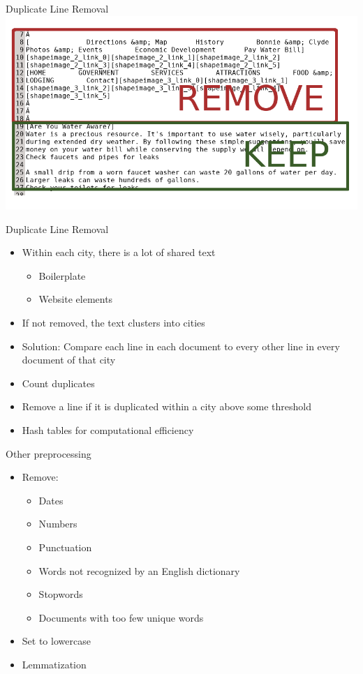 \documentclass[12pt]{beamer}
\begin{document}
\begin{frame}{Duplicate Line Removal}
	\includegraphics[width = \linewidth]{duplicateLineRemoval.png}
\end{frame}

\begin{frame}{Duplicate Line Removal}
\begin{itemize}
	\item Within each city, there is a lot of shared text
	\begin{itemize}
		\item Boilerplate
		\item Website elements
	\end{itemize}
	\item If not removed, the text clusters into cities
\end{itemize}
\begin{itemize}
	\item Solution: Compare each line in each document to every other line in every document of that city
	\item Count duplicates
	\item Remove a line if it is duplicated within a city above some threshold
	\item Hash tables for computational efficiency
\end{itemize}
\end{frame}

\begin{frame}{Other preprocessing}
\begin{itemize}
	\item Remove:
	\begin{itemize}
		\item Dates
		\item Numbers
		\item Punctuation
		\item Words not recognized by an English dictionary
		\item Stopwords
		\item Documents with too few unique words
	\end{itemize}
\item Set to lowercase
\item Lemmatization
\end{itemize}
\end{frame}
\end{document}
